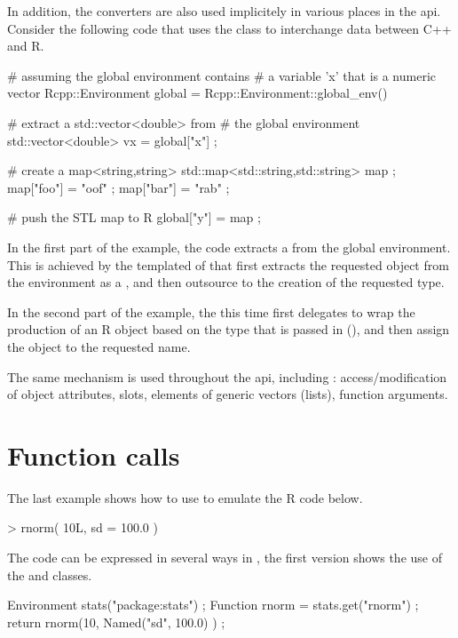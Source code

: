 In addition, the converters are also used implicitely
in various places in the  api. 
Consider the following code that uses the  class to 
interchange data between C++ and R.

\begin{example}
# assuming the global environment contains 
# a variable 'x' that is a numeric vector
Rcpp::Environment global = 
	Rcpp::Environment::global_env()

# extract a std::vector<double> from 
# the global environment
std::vector<double> vx = global["x"] ;

# create a map<string,string>
std::map<std::string,std::string> map ;
map["foo"] = "oof" ;
map["bar"] = "rab" ;

# push the STL map to R
global["y"] = map ;
\end{example}

In the first part of the example, the code extracts a 
 from the global environment. This is 
achieved by the templated  of 
that first extracts the requested object from the environment as a , 
and then outsource to  the creation of the 
requested type. 

In the second part of the example, the  this time 
first delegates to wrap the production of an R object based on the 
type that is passed in (), 
and then assign the object to the requested name.

The same mechanism is used throughout the api, including : access/modification
of object attributes, slots, elements of generic vectors (lists), 
function arguments. 

\section{Function calls}

The last example shows how to use  to emulate the R code below.

\begin{example}
> rnorm( 10L, sd = 100.0 )
\end{example}

The code can be expressed in several ways in , the first version
shows the use of the  and  classes. 

\begin{example}
Environment stats("package:stats") ;
Function rnorm = stats.get("rnorm") ;
return rnorm(10, Named("sd", 100.0) ) ;
\end{example}


